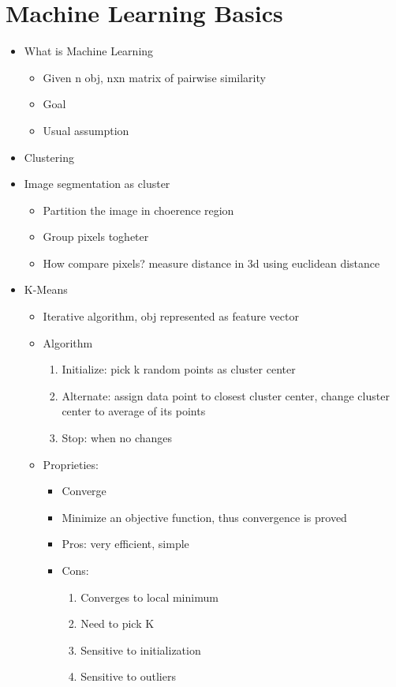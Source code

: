 \documentclass[12pt,oneside]{report}
\begin{document}
\chapter{Machine Learning Basics}
\begin{itemize}
    \item What is Machine Learning
    \begin{itemize}
        \item Given n obj, nxn matrix of pairwise similarity
        \item Goal
        \item Usual assumption
    \end{itemize}
    \item Clustering 
    \item Image segmentation as cluster
    \begin{itemize}
        \item Partition the image in choerence region
        \item Group pixels togheter
        \item How compare pixels? measure distance in 3d using euclidean distance
    \end{itemize}
    \item K-Means
    \begin{itemize}
        \item Iterative algorithm, obj represented as feature vector
        \item Algorithm
        \begin{enumerate}
            \item Initialize: pick k random points as cluster center
            \item Alternate: assign data point to closest cluster center, change cluster center to average of its points
            \item Stop: when no changes
        \end{enumerate}
        \item Proprieties:
        \begin{itemize}
            \item Converge
            \item Minimize an objective function, thus convergence is proved
            \item Pros: very efficient, simple
            \item Cons:
            \begin{enumerate}
                \item Converges to local minimum
                \item Need to pick K
                \item Sensitive to initialization
                \item Sensitive to outliers
            \end{enumerate}
        \end{itemize}
    \end{itemize}
\end{itemize}
\end{document}
